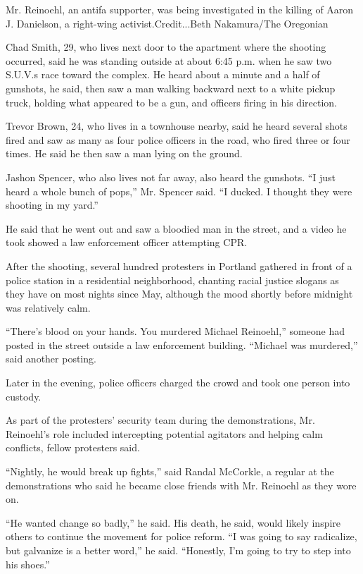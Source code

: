 Mr. Reinoehl, an antifa supporter, was being investigated in the killing
of Aaron J. Danielson, a right-wing activist.Credit...Beth Nakamura/The
Oregonian

Chad Smith, 29, who lives next door to the apartment where the shooting
occurred, said he was standing outside at about 6:45 p.m. when he saw
two S.U.V.s race toward the complex. He heard about a minute and a half
of gunshots, he said, then saw a man walking backward next to a white
pickup truck, holding what appeared to be a gun, and officers firing in
his direction.

Trevor Brown, 24, who lives in a townhouse nearby, said he heard several
shots fired and saw as many as four police officers in the road, who
fired three or four times. He said he then saw a man lying on the
ground.

Jashon Spencer, who also lives not far away, also heard the gunshots.
``I just heard a whole bunch of pops,'' Mr. Spencer said. ``I ducked. I
thought they were shooting in my yard.''

He said that he went out and saw a bloodied man in the street, and a
video he took showed a law enforcement officer attempting CPR.

After the shooting, several hundred protesters in Portland gathered in
front of a police station in a residential neighborhood, chanting racial
justice slogans as they have on most nights since May, although the mood
shortly before midnight was relatively calm.

``There's blood on your hands. You murdered Michael Reinoehl,'' someone
had posted in the street outside a law enforcement building. ``Michael
was murdered,'' said another posting.

Later in the evening, police officers charged the crowd and took one
person into custody.

As part of the protesters' security team during the demonstrations, Mr.
Reinoehl's role included intercepting potential agitators and helping
calm conflicts, fellow protesters said.

``Nightly, he would break up fights,'' said Randal McCorkle, a regular
at the demonstrations who said he became close friends with Mr. Reinoehl
as they wore on.

``He wanted change so badly,'' he said. His death, he said, would likely
inspire others to continue the movement for police reform. ``I was going
to say radicalize, but galvanize is a better word,'' he said.
``Honestly, I'm going to try to step into his shoes.''

